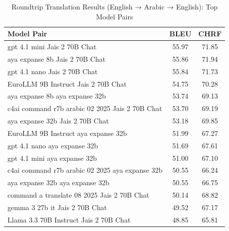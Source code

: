 \begin{table}[htbp]
\centering
\caption{Roundtrip Translation Results (English → Arabic → English): Top Model Pairs}
\label{tab:roundtrip}
\begin{tabular}{l@{\hspace{3pt}}c@{\hspace{3pt}}c}
\toprule
Model Pair & BLEU & CHRF \\
\midrule
gpt 4.1 mini Jais 2 70B Chat & 55.97 & 71.85 \\
aya expanse 8b Jais 2 70B Chat & 55.86 & 71.94 \\
gpt 4.1 nano Jais 2 70B Chat & 55.84 & 71.73 \\
EuroLLM 9B Instruct Jais 2 70B Chat & 54.75 & 70.28 \\
aya expanse 8b aya expanse 32b & 53.74 & 69.13 \\
c4ai command r7b arabic 02 2025 Jais 2 70B Chat & 53.70 & 69.19 \\
aya expanse 32b Jais 2 70B Chat & 53.18 & 69.85 \\
EuroLLM 9B Instruct aya expanse 32b & 51.99 & 67.27 \\
gpt 4.1 nano aya expanse 32b & 51.69 & 67.61 \\
gpt 4.1 mini aya expanse 32b & 51.00 & 67.10 \\
c4ai command r7b arabic 02 2025 aya expanse 32b & 50.55 & 66.24 \\
aya expanse 32b aya expanse 32b & 50.55 & 66.75 \\
command a translate 08 2025 Jais 2 70B Chat & 50.14 & 68.82 \\
gemma 3 27b it Jais 2 70B Chat & 49.52 & 67.17 \\
Llama 3.3 70B Instruct Jais 2 70B Chat & 48.85 & 65.81 \\
\bottomrule
\end{tabular}
\end{table}